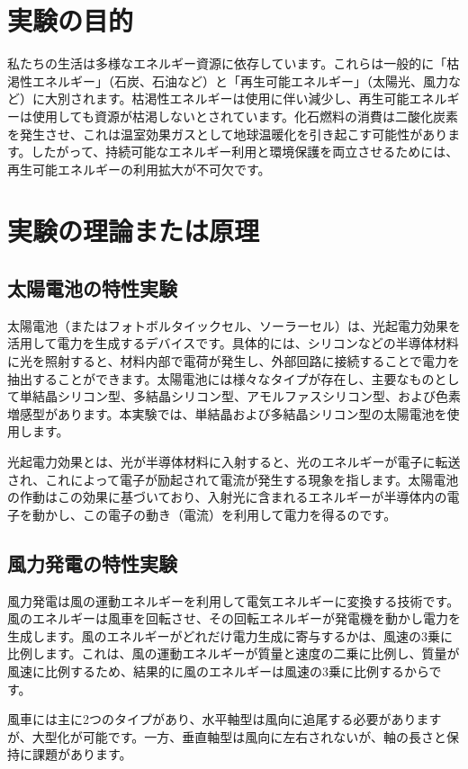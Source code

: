 \documentclass[a4paper,11pt,xelatex,ja=standard]{bxjsarticle}
\begin{document}
\section{実験の目的}

私たちの生活は多様なエネルギー資源に依存しています。これらは一般的に「枯渇性エネルギー」（石炭、石油など）と「再生可能エネルギー」（太陽光、風力など）に大別されます。枯渇性エネルギーは使用に伴い減少し、再生可能エネルギーは使用しても資源が枯渇しないとされています。化石燃料の消費は二酸化炭素を発生させ、これは温室効果ガスとして地球温暖化を引き起こす可能性があります。したがって、持続可能なエネルギー利用と環境保護を両立させるためには、再生可能エネルギーの利用拡大が不可欠です。

\section{実験の理論または原理}
    \subsection{太陽電池の特性実験}
        太陽電池（またはフォトボルタイックセル、ソーラーセル）は、光起電力効果を活用して電力を生成するデバイスです。具体的には、シリコンなどの半導体材料に光を照射すると、材料内部で電荷が発生し、外部回路に接続することで電力を抽出することができます。太陽電池には様々なタイプが存在し、主要なものとして単結晶シリコン型、多結晶シリコン型、アモルファスシリコン型、および色素増感型があります。本実験では、単結晶および多結晶シリコン型の太陽電池を使用します。

        光起電力効果とは、光が半導体材料に入射すると、光のエネルギーが電子に転送され、これによって電子が励起されて電流が発生する現象を指します。太陽電池の作動はこの効果に基づいており、入射光に含まれるエネルギーが半導体内の電子を動かし、この電子の動き（電流）を利用して電力を得るのです。
    \subsection{風力発電の特性実験}
        風力発電は風の運動エネルギーを利用して電気エネルギーに変換する技術です。風のエネルギーは風車を回転させ、その回転エネルギーが発電機を動かし電力を生成します。風のエネルギーがどれだけ電力生成に寄与するかは、風速の3乗に比例します。これは、風の運動エネルギーが質量と速度の二乗に比例し、質量が風速に比例するため、結果的に風のエネルギーは風速の3乗に比例するからです。

        風車には主に2つのタイプがあり、水平軸型は風向に追尾する必要がありますが、大型化が可能です。一方、垂直軸型は風向に左右されないが、軸の長さと保持に課題があります。
\end{document}
